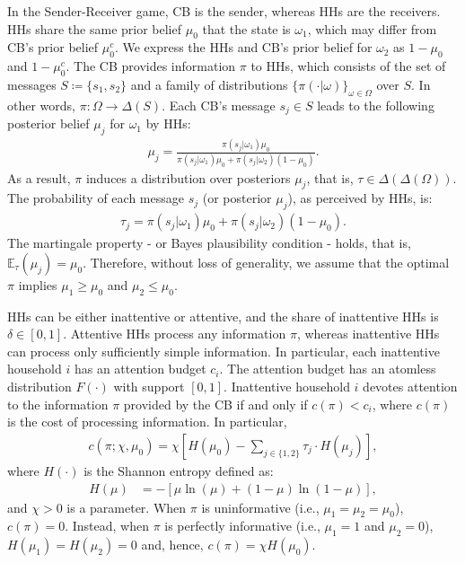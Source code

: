 \documentclass[12pt,a4paper]{article}
\begin{document}
In the Sender-Receiver game, CB is the sender, whereas HHs are the receivers.
HHs share the same prior belief $\mu_0$ that the state is $\omega_1$, which may differ from CB's prior belief $\mu_0^c$. We express the HHs and CB's prior belief for $\omega_2$ as $1-\mu_0$ and $1-\mu^c_0$. 
The CB provides information $\pi$ to HHs, which consists of the set of messages $S\coloneqq \{s_1, s_2\}$ and a family of distributions $\{\pi(\cdot|\omega)\}_{\omega\in\Omega}$ over $S$. In other words, $\pi: \Omega \to \Delta(S)$. Each CB's message $s_j\in S$ leads to the following posterior belief $\mu_j$ for $\omega_1$ by HHs:
\begin{align}
    \mu_j = \frac{\pi(s_j|\omega_1)\mu_0}{\pi(s_j|\omega_1)\mu_0 + \pi(s_j|\omega_2)(1-\mu_0)}.
\end{align}
As a result, $\pi$ induces a distribution over posteriors $\mu_j$, that is, $\tau \in \Delta(\Delta(\Omega))$. The probability of each message $s_j$ (or posterior $\mu_j$), as perceived by HHs, is: 
\begin{align}
\label{tau}
    \tau_j = \pi(s_j|\omega_1)\mu_0 + \pi(s_j|\omega_2)(1-\mu_0).
\end{align}
The martingale property - or Bayes plausibility condition - holds, that is, $\mathbb{E}_{\tau}(\mu_j)=\mu_0$. Therefore, without loss of generality, we assume that the optimal $\pi$ implies $\mu_1\geq\mu_0$ and $\mu_2\leq\mu_0$. 

HHs can be either inattentive or attentive, and the share of inattentive HHs is $\delta\in[0,1]$. Attentive HHs process any information $\pi$, whereas inattentive HHs can process only sufficiently simple information. In particular, each inattentive household $i$ has an attention budget $c_i$. The attention budget has an atomless distribution $F(\cdot)$ with support $[0,1]$. Inattentive household $i$ devotes attention to the information $\pi$ provided by the CB if and only if $c(\pi)<c_i$, where $c(\pi)$ is the cost of processing information. In particular,
\begin{align}
\label{cost}
    c(\pi; \chi, \mu_0) = \chi\left[H(\mu_0)-\sum_{j \in \{1,2\}}\tau_j \cdot H(\mu_j)\right],
\end{align}
where $H(\cdot)$ is the Shannon entropy defined as:
\begin{align}
    H(\mu) & = -\left[ \mu\ln(\mu) + (1-\mu)\ln(1-\mu) \right],
\end{align}
and $\chi>0$ is a parameter. When $\pi$ is uninformative (i.e., $\mu_1=\mu_2 = \mu_0$), $c(\pi)=0$. Instead, when $\pi$ is perfectly informative (i.e., $\mu_1=1$ and $\mu_2=0$), $H(\mu_1)=H(\mu_2)=0$ and, hence, $c(\pi)=\chi H(\mu_0)$. 
\end{document}
